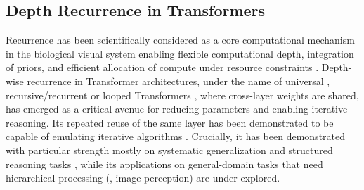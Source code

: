 \subsection{Depth Recurrence in Transformers}
Recurrence has been scientifically considered as a core computational mechanism in the biological visual system enabling flexible computational depth, integration of priors, and efficient allocation of compute under resource constraints \citep{van2020going}. Depth-wise recurrence in Transformer architectures, under the name of universal \citep{devlin-etal-2019-bert}, recursive/recurrent \citep{bae2025relaxed,geiping2025scaling} or looped Transformers \citep{giannou2023looped}, where cross-layer weights are shared, has emerged as a critical avenue for reducing parameters and enabling iterative reasoning. Its repeated reuse of the same layer has been demonstrated to be capable of emulating iterative algorithms \citep{schwarzschild2021can,saunshi2025reasoning}. Crucially, it has been demonstrated with particular strength mostly on systematic generalization \citep{csordas2021devil} and structured reasoning tasks \citep{schwarzschild2021can,bansal2022end}, while its applications on general-domain tasks that need hierarchical processing (\eg, image perception) are under-explored. 
